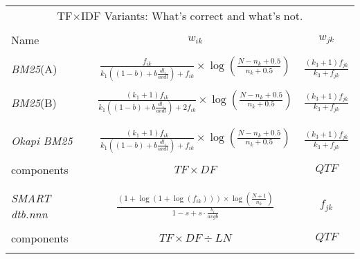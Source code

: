 \begin{table}
  \centering
  \small
  \begin{minipage}[t]{0.65\textwidth}
    
    \begin{tabular}{lcc}
      \multicolumn{3}{c}{TF$\times$IDF Variants: What's correct and what's not.}\\
      \\
      Name & $w_{ik}$ & $w_{jk}$\\
      \hline\hline
      \\
      \emph{BM25}(A)
      & $\frac{f_{ik}}{k_{1}((1-b)+b\frac{dl_{i}}{avdl})+f_{ik}} \times \log(\frac{N-n_{k}+0.5}{n_{k}+0.5})$
      & $\frac{(k_{3}+1)f_{jk}}{k_{3}+f_{jk}}$ \\
      \\
      \emph{BM25}(B)
      & $\frac{(k_{1}+1)f_{ik}}{k_{1}((1-b)+b\frac{dl_{i}}{avdl})+2f_{ik}} \times \log(\frac{N-n_{k}+0.5}{n_{k}+0.5})$
      & $\frac{(k_{3}+1)f_{jk}}{k_{3}+f_{jk}}$ \\
      \\\hline
      \\
      \emph{Okapi BM25}
      & $\frac{(k_{1}+1)f_{ik}}{k_{1}((1-b)+b\frac{dl_{i}}{avdl})+f_{ik}} \times \log(\frac{N-n_{k}+0.5}{n_{k}+0.5})$
      & $\frac{(k_{3}+1)f_{jk}}{k_{3}+f_{jk}}$ \\
      \\
      components & $TF \times DF$ & $QTF$ \\
      \\\hline
      \\
      \emph{SMART dtb.nnn}
      & $\frac{(1+\log(1+\log(f_{ik}))) \times \log(\frac{N+1}{n_{k}})}{1-s+s \cdot \frac{b_{i}}{avgb}}$
      & $f_{jk}$ \\
      \\
      components & $TF \times DF \div LN$ & $QTF$ \\
      \\\hline\hline

    \end{tabular}
    

\end{minipage}
\end{table}
